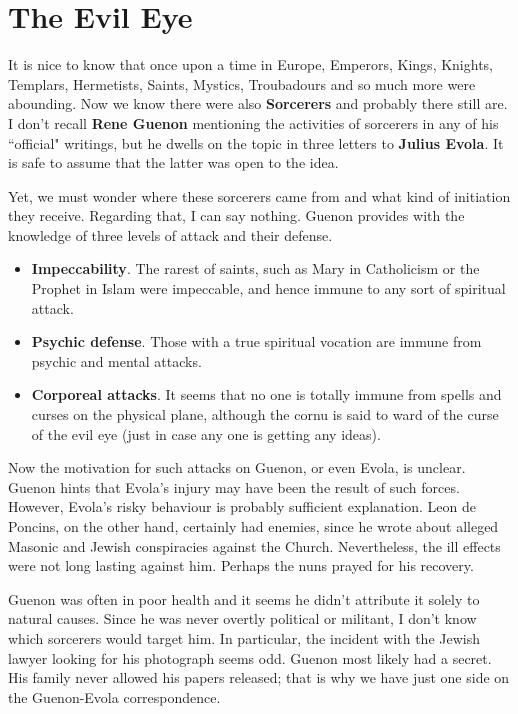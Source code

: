 \section{The Evil Eye}

It is nice to know that once upon a time in Europe, Emperors, Kings, Knights, Templars, Hermetists, Saints, Mystics, Troubadours and so much more were abounding. Now we know there were also \textbf{Sorcerers} and probably there still are. I don't recall \textbf{Rene Guenon} mentioning the activities of sorcerers in any of his ``official" writings, but he dwells on the topic in three letters to \textbf{Julius Evola}. It is safe to assume that the latter was open to the idea.

Yet, we must wonder where these sorcerers came from and what kind of initiation they receive. Regarding that, I can say nothing. Guenon provides with the knowledge of three levels of attack and their defense.

\begin{itemize}
\item \textbf{Impeccability}. The rarest of saints, such as Mary in Catholicism or the Prophet in Islam were impeccable, and hence immune to any sort of spiritual attack. 
\item \textbf{Psychic defense}. Those with a true spiritual vocation are immune from psychic and mental attacks. 
\item \textbf{Corporeal attacks}. It seems that no one is totally immune from spells and curses on the physical plane, although the cornu is said to ward of the curse of the evil eye (just in case any one is getting any ideas). 
\end{itemize}
Now the motivation for such attacks on Guenon, or even Evola, is unclear. Guenon hints that Evola's injury may have been the result of such forces. However, Evola's risky behaviour is probably sufficient explanation. Leon de Poncins, on the other hand, certainly had enemies, since he wrote about alleged Masonic and Jewish conspiracies against the Church. Nevertheless, the ill effects were not long lasting against him. Perhaps the nuns prayed for his recovery.

Guenon was often in poor health and it seems he didn't attribute it solely to natural causes. Since he was never overtly political or militant, I don't know which sorcerers would target him. In particular, the incident with the Jewish lawyer looking for his photograph seems odd. Guenon most likely had a secret. His family never allowed his papers released; that is why we have just one side on the Guenon-Evola correspondence.

